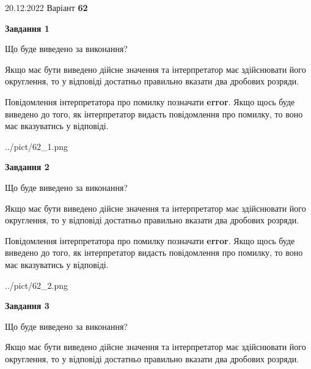 \documentclass[12pt, ukrainian]{article}
\begin{document}
{20.12.2022 Варіант \No \textbf { 62 }\par}
{
\begin {Large}

{\begin {center}\textbf{Завдання 1}\end {center}}\par
Що буде виведено за виконання? \par

Якщо має бути виведено дійсне значення та інтерпретатор має здійснювати його округлення, 
то у відповіді достатньо правильно вказати два дробових розряди.

Повідомлення інтерпретатора про помилку позначати \textbf{error}.
Якщо щось буде виведено до того, як інтерпретатор видасть повідомлення про помилку, 
то воно має вказуватись у відповіді. \par

\begin{center}
	{../pict/62_1.png}
\end{center}
\newpage

{\begin {center}\textbf{Завдання 2}\end {center}}\par
Що буде виведено за виконання? \par

Якщо має бути виведено дійсне значення та інтерпретатор має здійснювати його округлення, 
то у відповіді достатньо правильно вказати два дробових розряди.

Повідомлення інтерпретатора про помилку позначати \textbf{error}.
Якщо щось буде виведено до того, як інтерпретатор видасть повідомлення про помилку, 
то воно має вказуватись у відповіді. \par

\begin{center}
	{../pict/62_2.png}
\end{center}
\newpage

{\begin {center}\textbf{Завдання 3}\end {center}}\par
Що буде виведено за виконання? \par

Якщо має бути виведено дійсне значення та інтерпретатор має здійснювати його округлення, 
то у відповіді достатньо правильно вказати два дробових розряди.


\end{Large}}
\end{document}
